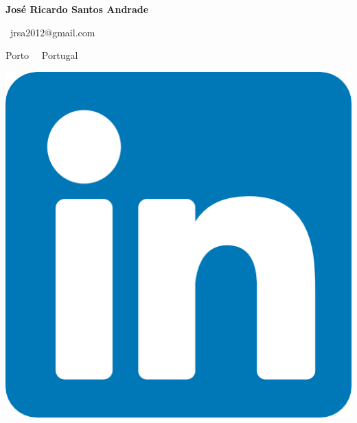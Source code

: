 \documentclass{mycv}
\begin{document}
\begin{center}
	{\LARGE\textbf{José Ricardo Santos Andrade}} \\
	\vspace{0.2cm}	
	
	\ jrsa2012@gmail.com
	
	
	
	\vspace{0.2cm}	
	
		Porto~\textbullet 
	\ Portugal

\end{center}

\begin{center}
	\vspace{0.4cm}
	
	\href{https://www.linkedin.com/in/jrsa2012}{\includegraphics[scale=0.08]{figs/linkedin_logo.png}}
	\ \ \ \ \ \ \ \ \ \

\end{center}
\end{document}

